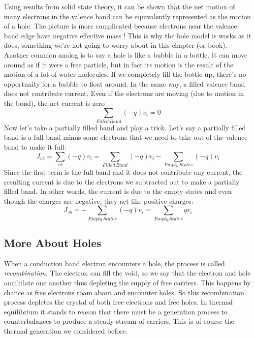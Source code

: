 Using results from solid state theory, it can be shown that the net motion of many electrons in the valence band can be equivalently represented as the motion of a hole.  The picture is more complicated because electrons near the valence band edge have negative effective mass !  This is why the hole model is works as it does, something we’re not going to worry about in this chapter (or book).  Another common analog is to say a hole is like a bubble in a bottle. It can move around as if it were a free particle, but in fact its motion is the result of the motion of a lot of water molecules.  If we completely fill the bottle up, there’s no opportunity for a bubble to float around.  In the same way, a filled valence band does not contribute current.  Even if the electrons are moving (due to motion in the bond), the net current is zero
%
\begin{equation}
	\sum\limits_{Filled\,Band} {( - q){v_i}} = 0
\end{equation}
%
Now let’s take a partially filled band and play a trick.  Let’s say a partially filled band is a full band minus some electrons that we need to take out of the valence band to make it full: 
\begin{equation}
{J_{vb}} = \sum\limits_{vb} {( - q){v_i}}  = \sum\limits_{Filled\,Band} {( - q){v_i} - \sum\limits_{Empty\,States} {( - q){v_i}} }
\end{equation}
Since the first term is the full band and it does not contribute any current, the resulting current is due to the electrons we subtracted out to make a partially filled band.  In other words, the current is due to the empty states and even though the charges are negative, they act like positive charges:
\begin{equation}
{J_{vb}} =  - \sum\limits_{Empty\,States} {( - q){v_i}}  = \sum\limits_{Empty\,States} {q{v_i}}
\end{equation}






\subsection{More About Holes}




When a conduction band electron encounters a hole, the process is called \textit{recombination}.  The electron can fill the void, so we say that the electron and hole annihilate one another thus depleting the supply of free carriers.  This happens by chance as free electrons roam about and encounter holes.  So this recombination process depletes the crystal of both free electrons and free holes.  In thermal equilibrium it stands to reason that there must be a generation process to counterbalances to produce a steady stream of carriers.  This is of course the thermal generation we considered before.




